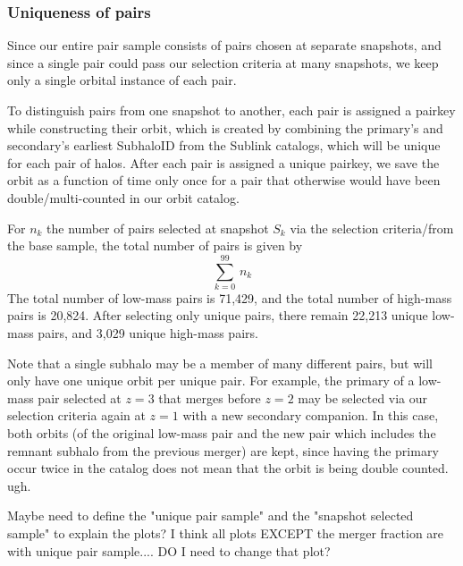 \documentclass[twocolumn]{aastex631}
\begin{document}
\subsubsection{Uniqueness of pairs}
Since our entire pair sample consists of pairs chosen at separate snapshots, and since a single pair could pass our selection criteria at many snapshots, we keep only a single orbital instance of each pair. 

To distinguish pairs from one snapshot to another, each pair is assigned a pairkey while constructing their orbit, which is created by combining the primary's and secondary's earliest SubhaloID from the Sublink catalogs, which will be unique for each pair of halos. 
After each pair is assigned a unique pairkey, we save the orbit as a function of time only once for a pair that otherwise would have been double/multi-counted in our orbit catalog.

For $n_k$ the number of pairs selected at snapshot $S_k$ via the selection criteria/from the base sample, the total number of pairs is given by
\begin{equation*}
    \sum_{k=0}^{99}\, n_k
\end{equation*}
The total number of low-mass pairs is 71,429, and the total number of high-mass pairs is 20,824.
After selecting only unique pairs, there remain 22,213 unique low-mass pairs, and 3,029 unique high-mass pairs.

Note that a single subhalo may be a member of many different pairs, but will only have one unique orbit per unique pair.
For example, the primary of a low-mass pair selected at $z=3$ that merges before $z=2$ may be selected via our selection criteria again at $z=1$ with a new secondary companion. 
In this case, both orbits (of the original low-mass pair and the new pair which includes the remnant subhalo from the previous merger) are kept, since having the primary occur twice in the catalog does not mean that the orbit is being double counted. ugh. 


Maybe need to define the "unique pair sample" and the "snapshot selected sample" to explain the plots? I think all plots EXCEPT the merger fraction are with unique pair sample.... DO I need to change that plot? 

\end{document}
